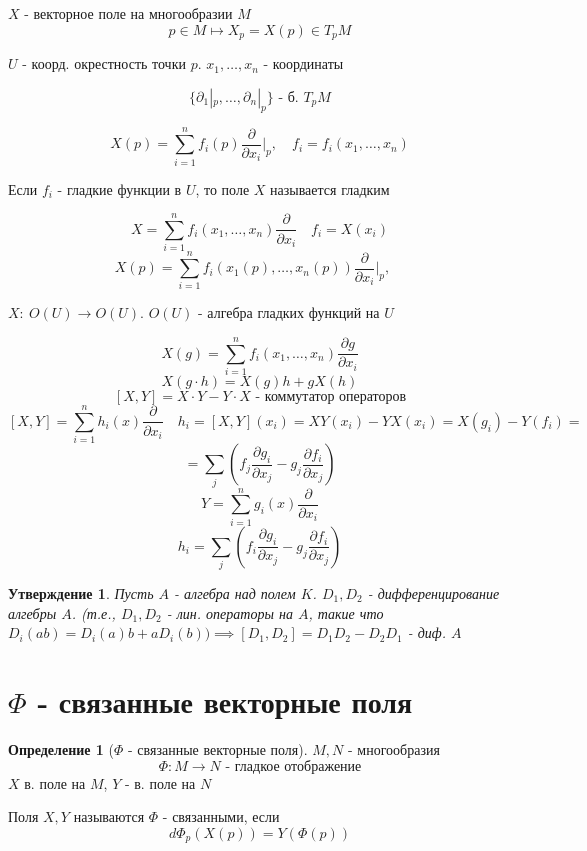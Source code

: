 \documentclass[a4paper]{article}
\newtheorem*{statement}{Утверждение}
\theoremstyle{definition}
\newtheorem*{definition}{Определение}
\begin{document}
$ X $ - векторное поле на многообразии $ M $ 
\[
    p \in M \mapsto X_p = X(p) \in T_p M
\]

$ U $ - коорд. окрестность точки $ p $. $ x_1, \dots, x_n $ - координаты 

\[
    \{ \partial_1 |_p, \dots, \partial_n |_p \} \text{ - б. } T_p M
\]

\[
    X(p) = \sum_{i=1}^{n} f_i(p) \frac{\partial}{\partial x_i} |_p, \quad
    f_i = f_i(x_1, \dots, x_n)
\]

Если $ f_i $ - гладкие функции в $ U $, то поле $ X $ называется гладким

\[
    X = \sum_{i=1}^{n} f_i(x_1, \dots, x_n) \frac{\partial}{\partial x_i}
    \quad f_i = X(x_i)
\]
\[
    X(p) = \sum_{i=1}^{n} f_i(x_1(p), \dots, x_n(p)) \frac{\partial}{\partial x_i} |_p, \quad
\]

$ X: \ O(U) \to O(U) $. $ O(U) \text{ - алгебра гладких функций на } U $  

\[
    X(g) = \sum_{i=1}^{n} f_i(x_1, \dots, x_n) \frac{\partial g}{\partial x_i} 
\]
\[
    X(g \cdot h) = X(g) h + g X(h)
\]
\[
    [X,Y] = X \cdot Y - Y \cdot X \text{ - коммутатор операторов}
\]
\[
    [X, Y] = \sum_{i=1}^{n} h_i(x) \frac{\partial}{\partial x_i} \quad
    h_i = [X,Y](x_i) = XY(x_i) - YX(x_i) = X(g_i) - Y(f_i) =
\]
\[
    = \sum_{j} \left( f_j \frac{\partial g_i}{\partial x_j} -
        g_j \frac{\partial f_i}{\partial x_j} \right)
\]
\[
    Y = \sum_{i=1}^{n} g_i(x) \frac{\partial}{\partial x_i}
\]
\[
    h_i = \sum_{j} \left( f_i \frac{\partial g_i}{\partial x_j} - g_j 
    \frac{\partial f_i}{\partial x_j} \right)
\]

\begin{tcolorbox}
    \begin{statement}
        Пусть $ A $ - алгебра над полем $ K $.
        $ D_1, D_2 $ - дифференцирование алгебры $ A $. (т.е., $ D_1, D_2 $ - лин. операторы
        на $ A $, такие что $ D_i(ab) = D_i(a) b + a D_i(b))  \implies
        [D_1, D_2] = D_1 D_2 - D_2 D_1 $ - диф. $ A $ 
    \end{statement}
\end{tcolorbox}

\section*{ $ \Phi $ - связанные векторные поля}

\begin{tcolorbox}[title=$ \Phi $ - связанные векторные поля]
    \begin{definition}[$ \Phi $ - связанные векторные поля]
        $ M, N $ - многообразия
        \[
            \Phi: M \to N \text{ - гладкое отображение}
        \]
        $ X $ в. поле на $ M $, $ Y $ - в. поле на $ N $  

        Поля $ X, Y $ называются $ \Phi $ - связанными, если  
        \[
            d\Phi_p(X(p)) = Y(\Phi(p))
        \]
    \end{definition}
\end{tcolorbox}
\end{document}
